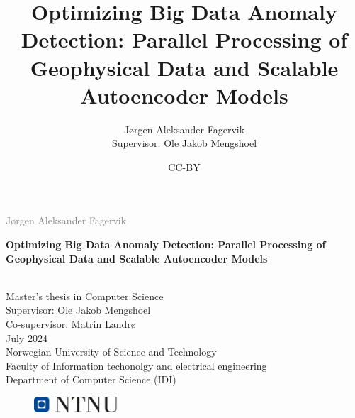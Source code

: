 \documentclass[british]{ntnuthesis}
\title{Optimizing Big Data Anomaly Detection: Parallel Processing of Geophysical Data and Scalable Autoencoder Models}
\author{Jørgen Aleksander Fagervik \\
        Supervisor: Ole Jakob Mengshoel}
\date{CC-BY \ntnuthesisdate}
\begin{document}
\begin{titlepage}
\vspace*{1.5cm}

\noindent  \textcolor{gray}{\large Jørgen Aleksander Fagervik} \\
\vspace{1cm}

\noindent \textbf{\Large Optimizing Big Data Anomaly Detection: Parallel Processing of Geophysical Data and Scalable Autoencoder Models} \\
\vspace{0.5cm}

 \\



\vspace{7cm}
\noindent Master's thesis in Computer Science \\
Supervisor: Ole Jakob Mengshoel \\
Co-supervisor: Matrin Landrø \\
July 2024 \\

\vspace{0.2cm}
\noindent Norwegian University of Science and Technology \\
Faculty of Information techonolgy and electrical engineering \\
Department of Computer Science (IDI) \\

\begin{figure}[h]
    \includegraphics[width=0.28\textwidth]{figures/ntnu_basic.png}
\end{figure}
\end{titlepage}
\restoregeometry
\myemptypage 





\tableofcontents
\listoffigures
\listoftables
\lstlistoflistings

\printglossary[type=\acronymtype] %
\printglossary                    %









\chapter*{\bibname}
\printbibliography[heading=none]

\appendix









\end{document}
